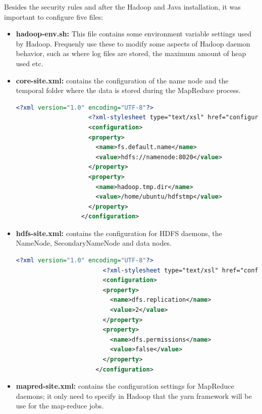 \documentclass{article}
\begin{document}
        Besides the security rules and after the Hadoop and Java installation, it was important to configure five files:
            \begin{itemize}
                \item \textbf{hadoop-env.sh:} This file contains some environment variable settings used by Hadoop. Frequenly use these to modify some aspects of Hadoop daemon behavior, such as where log files are stored, the maximum amount of heap used etc.                
                \item \textbf{core-site.xml:} contains the configuration of the name node and the temporal folder where the data is stored during the MapReduce process.
                \begin{lstlisting}[language=XML, caption= core-site.xml, label={lst:core}]
                    <?xml version="1.0" encoding="UTF-8"?>
                    <?xml-stylesheet type="text/xsl" href="configuration.xsl"?>
                    <configuration>
                    <property>
                      <name>fs.default.name</name>
                      <value>hdfs://namenode:8020</value>
                    </property>
                    <property>
                      <name>hadoop.tmp.dir</name>
                      <value>/home/ubuntu/hdfstmp</value>
                    </property>
                  </configuration>
                \end{lstlisting}
                \item \textbf{hdfs-site.xml:} contains the configuration for HDFS daemons, the NameNode, SecondaryNameNode  and data nodes.
                    \begin{lstlisting}[language=XML, caption= hdfs-site.xml, label={lst:hdfs}]
                        <?xml version="1.0" encoding="UTF-8"?>
                        <?xml-stylesheet type="text/xsl" href="configuration.xsl"?>
                        <configuration>
                        <property>
                          <name>dfs.replication</name>
                          <value>2</value>
                        </property>
                        <property>
                          <name>dfs.permissions</name>
                          <value>false</value>
                        </property>
                      </configuration>
                    \end{lstlisting}
                \item \textbf{mapred-site.xml:} contains the configuration settings for MapReduce daemons; it only need to specify in Hadoop that the yarn framework will be use for the map‐reduce jobs.

\end{itemize}
\end{document}
